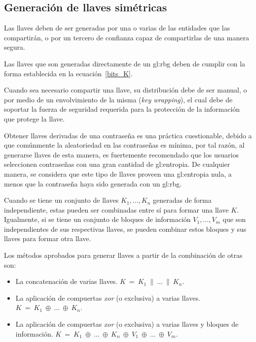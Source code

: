 \subsection{Generación de llaves simétricas}
Las llaves deben de ser generadas por una o varias de las entidades que
las compartirán, o por un tercero de confianza capaz de compartirlas de una
manera segura.

Las llaves que son generadas directamente de un \gls{gl:rbg} deben de cumplir
con la forma establecida en la ecuación~\ref{bits_K}.

Cuando sea necesario compartir una llave, su distribución debe de ser manual,
o por medio de un envolvimiento de la misma (\textit{key wrapping}), el cual
debe de soportar la fuerza de seguridad requerida para la protección de la
información que protege la llave.

Obtener llaves derivadas de una contraseña es una práctica cuestionable,
debido a que comúnmente la aleatoriedad en las contraseñas es mínima, por tal
razón, al generarse llaves de esta manera, es fuertemente recomendado que los
usuarios seleccionen contraseñas con una gran cantidad de \gls{gl:entropia}.
De cualquier manera, se considera que este tipo de llaves proveen una
\gls{gl:entropia} nula, a menos que la contraseña haya sido generada con
un \gls{gl:rbg}.

Cuando se tiene un conjunto de llaves $K_1, \dots, K_n$ generadas de forma
independiente, estas pueden ser combinadas entre sí para formar una llave $K$.
Igualmente, si se tiene un conjunto de bloques de información $V_1, \dots,
V_m$ que son independientes de sus respectivas llaves, se pueden combinar
estos bloques y sus llaves para formar otra llave.

Los métodos aprobados para generar llaves a partir de la combinación de
otras son:
\begin{itemize}

  \item La concatenación de varias llaves.
    $K\: =\: K_1\: \parallel\: \dots\: \parallel\: K_n$.

  \item La aplicación de compuertas \textit{xor} (o exclusiva) a varias llaves.
    $K\: =\: K_1\: \oplus\: \dots\: \oplus\: K_n$.

  \item La aplicación de compuertas \textit{xor} (o exclusiva) a varias llaves
    y bloques de información.
    $K\: =\: K_1\: \oplus\: \dots\: \oplus\: K_n\:
    \oplus\: V_1\: \oplus\: \dots\: \oplus\: V_m$.

\end{itemize}

